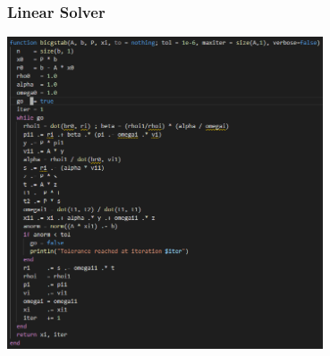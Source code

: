\begin{frame}[fragile]
  \frametitle{Linear Solver}
  \begin{center}
   \includegraphics[width=0.7\textwidth]{figures/bicgstab.png}
  \end{center}
\end{frame}

